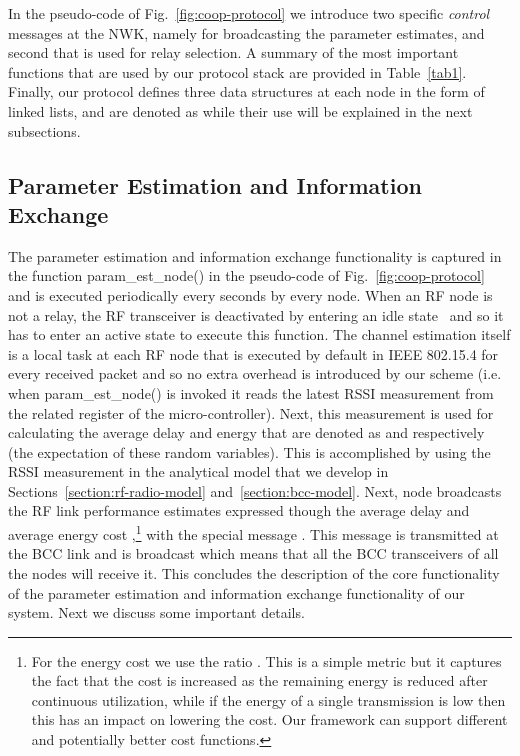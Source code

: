 \documentclass[10pt]{IEEEtran}
\newcounter{section:outage-analysis}
\begin{document}
In the pseudo-code of Fig.~\ref{fig:coop-protocol} we introduce two specific \textit{control} messages at the NWK, namely  for broadcasting the parameter estimates, and second  that is used for relay selection. A summary of the most important functions that are used by our protocol stack are provided in Table~\ref{tab1}. Finally, our protocol defines three data structures at each node in the form of linked lists, and are denoted as  while their use will be explained in the next subsections.




\subsection{Parameter Estimation and Information Exchange}
\label{subsection:1}
The parameter estimation and information exchange functionality is captured in the function param\_est\_node() in the pseudo-code of Fig.~\ref{fig:coop-protocol} and is executed periodically every  seconds by every node. When an RF node is not a relay, the RF transceiver is deactivated by entering an idle state~\cite{cc2420} and so it has to enter an active state to execute this function. The channel estimation itself is a local task at each RF node that is executed by default in IEEE 802.15.4 for every received packet and so no extra overhead is introduced by our scheme (i.e. when param\_est\_node() is invoked it reads the latest RSSI measurement from the related register of the micro-controller). Next, this measurement is used for calculating the average delay and energy that are denoted as   and  respectively (the expectation of these random variables). This is accomplished by using the RSSI measurement in the analytical model that we develop in Sections~\ref{section:rf-radio-model} and~\ref{section:bcc-model}. Next, node  broadcasts the RF link performance estimates expressed though the average delay  and average energy cost ,\footnote{For the energy cost we use the ratio . This is a simple metric but it captures the fact that the cost is increased as the remaining energy is reduced after continuous utilization, while if the energy of a single transmission is low then this has an impact on lowering the cost. Our framework can support different and potentially better cost functions.} with the special message . This message is transmitted at the BCC link and is broadcast which means that all the BCC transceivers of all the nodes will receive it. This concludes the description of the core functionality of the parameter estimation and information exchange functionality of our system. Next we discuss some important details.
\end{document}
